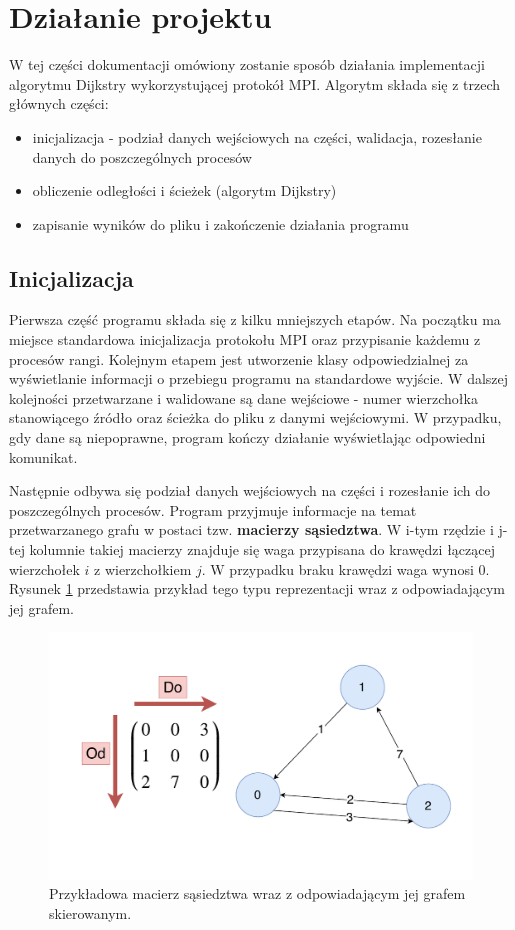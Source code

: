\documentclass[12pt]{article}
\begin{document}
\section{Działanie projektu}
W tej części dokumentacji omówiony zostanie sposób działania implementacji algorytmu Dijkstry wykorzystującej protokół MPI. Algorytm składa się z trzech głównych części:
\begin{itemize}
\item inicjalizacja - podział danych wejściowych na części, walidacja, rozesłanie danych do poszczególnych procesów
\item obliczenie odległości i ścieżek (algorytm Dijkstry)
\item zapisanie wyników do pliku i zakończenie działania programu
\end{itemize}


\subsection{Inicjalizacja}
Pierwsza część programu składa się z kilku mniejszych etapów. Na początku ma miejsce standardowa inicjalizacja protokołu MPI oraz przypisanie każdemu z procesów rangi. Kolejnym etapem jest utworzenie klasy odpowiedzialnej za wyświetlanie informacji o przebiegu programu na standardowe wyjście. W dalszej kolejności przetwarzane i walidowane są dane wejściowe - numer wierzchołka stanowiącego źródło oraz ścieżka do pliku z danymi wejściowymi. W przypadku, gdy dane są niepoprawne, program kończy działanie wyświetlając odpowiedni komunikat.

\vspace{5mm}
Następnie odbywa się podział danych wejściowych na części i rozesłanie ich do poszczególnych procesów. Program przyjmuje informacje na temat przetwarzanego grafu w postaci tzw. \textbf{macierzy sąsiedztwa}. W i-tym rzędzie i j-tej kolumnie takiej macierzy znajduje się waga przypisana do krawędzi łączącej wierzchołek $i$ z wierzchołkiem $j$. W przypadku braku krawędzi waga wynosi 0. Rysunek \ref{fig:am1} przedstawia przykład tego typu reprezentacji wraz z odpowiadającym jej grafem.

\begin{figure}[H]
\centering
\includegraphics[width=\textwidth]{static/AdjacencyMatrixExample.pdf}
\caption{Przykładowa macierz sąsiedztwa wraz z odpowiadającym jej grafem skierowanym.}
\label{fig:am1}
\end{figure}
\end{document}
